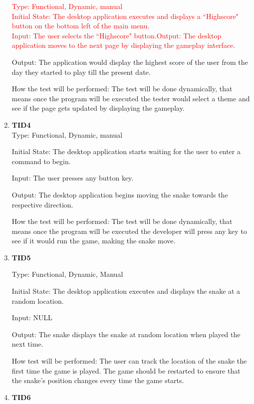 \documentclass[12pt, titlepage]{article}
\begin{document}
\begin{enumerate}
\textcolor{red} {Type: Functional, Dynamic, manual\\
Initial State: The desktop application executes and displays a ``Highscore" button on the bottom left of the main menu.\\
Input: The user selects the ``Highscore" button.Output: The desktop application moves to the next page by displaying the gameplay interface.\\}

Output: The application would display the highest score of the user from the day they started to play till the present date.

How the test will be performed: The test will be done dynamically, that means once the program will be executed the tester would select a theme and see if the page gets updated by displaying the gameplay.


\item{\textbf{TID4}\\}
Type: Functional, Dynamic, manual

Initial State: The desktop application starts waiting for the user to enter a command to begin.

Input: The user presses any button key.

Output: The desktop application begins moving the snake towards the respective direction.

How the test will be performed: The test will be done dynamically, that means once the program will be executed the developer will press any key to see if it would run the game, making the snake move.

\item{\textbf{TID5}\\}

Type: Functional, Dynamic, Manual 	
					
Initial State: The desktop application executes and displays the snake at a random location.	
				
Input: NULL

Output: The snake displays the snake at random location when played the next time.
					
How test will be performed: The user can track the location of the snake the first time the game is played. The game should be restarted to ensure that the snake's position changes every time the game starts.

\item{\textbf{TID6}\\}


\end{enumerate}
\end{document}
